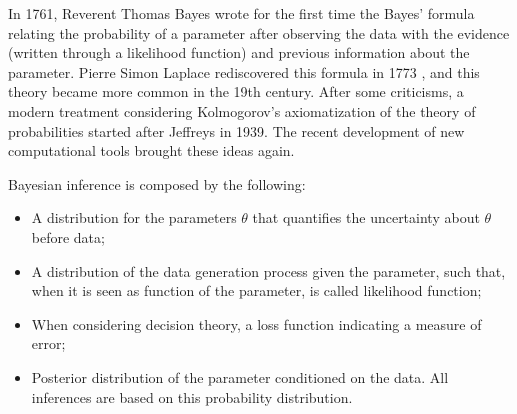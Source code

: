 In 1761, Reverent Thomas Bayes wrote for the first time the Bayes' formula
relating the probability of a parameter after observing the data with the
evidence (written through a likelihood function) and previous information
about the parameter. Pierre Simon Laplace rediscovered this formula in 1773
\cite{Robert2007}, and this theory became more common in the 19th century.
After some criticisms, a modern treatment considering Kolmogorov's axiomatization of the theory of probabilities started after Jeffreys in 1939.
The recent development of new computational tools brought these ideas again.

Bayesian inference is composed by the following: 

\begin{itemize}
    \item A distribution for the parameters $\theta$ that quantifies the
    uncertainty about $\theta$ before data;
    \item A distribution of the data generation process given the parameter,
    such that, when it is seen as function of the parameter, is called
    likelihood function;
    \item When considering decision theory, a loss function indicating a
    measure of error;
    \item Posterior distribution of the parameter conditioned on the data. All
    inferences are based on this probability distribution.
\end{itemize} 